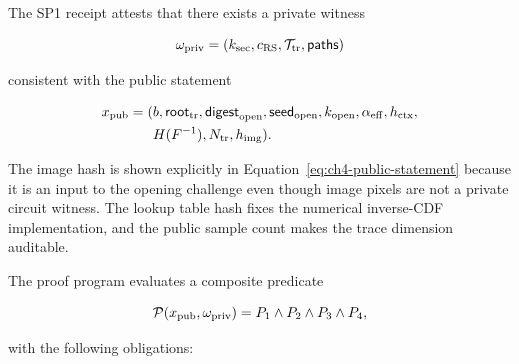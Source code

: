 The SP1 receipt \PPReceipt{} attests that there exists a private witness

\begin{equation}
    \omega_{\mathrm{priv}}
        =(
            k_{\mathrm{sec}},
            c_{\mathrm{RS}},
            \mathcal{T}_{\mathrm{tr}},
            \mathsf{paths}
          )
\label{eq:ch4-private-witness}
\end{equation}

consistent with the public statement

\begin{equation}
\begin{aligned}
    x_{\mathrm{pub}}
        =(&b,
           \mathsf{root}_{\mathrm{tr}},
           \mathsf{digest}_{\mathrm{open}},
           \mathsf{seed}_{\mathrm{open}},
           k_{\mathrm{open}},
           \alpha_{\mathrm{eff}},
           h_{\mathrm{ctx}},\\
          &H(F^{-1}),
           N_{\mathrm{tr}},
           h_{\mathrm{img}}).
\end{aligned}
\label{eq:ch4-public-statement}
\end{equation}

The image hash is shown explicitly in
Equation~\eqref{eq:ch4-public-statement} because it is an input to the opening
challenge even though image pixels are not a private circuit witness.  The lookup
table hash fixes the numerical inverse-CDF implementation, and the public sample
count makes the trace dimension auditable.

The proof program evaluates a composite predicate

\begin{equation}
    \mathcal P(x_{\mathrm{pub}},\omega_{\mathrm{priv}})
        =P_1\land P_2\land P_3\land P_4,
\label{eq:ch4-composite-predicate}
\end{equation}

with the following obligations:

